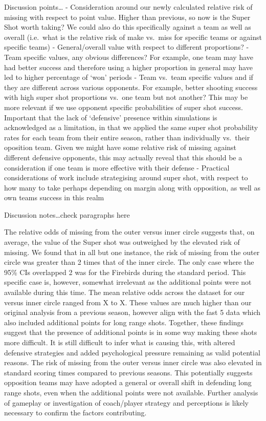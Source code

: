 \documentclass[]{elsarticle} %
\begin{document}
Discussion points\ldots{} - Consideration around our newly calculated
relative risk of missing with respect to point value. Higher than
previous, so now is the Super Shot worth taking? We could also do this
specifically against a team as well as overall (i.e.~what is the
relative risk of make vs.~miss for specific teams or against specific
teams) - General/overall value with respect to different proportions? -
Team specific values, any obvious differences? For example, one team may
have had better success and therefore using a higher proportion in
general may have led to higher percentage of `won' periods - Team
vs.~team specific values and if they are different across various
opponents. For example, better shooting success with high super shot
proportions vs.~one team but not another? This may be more relevant if
we use opponent specific probabilities of super shot success. Important
that the lack of `defensive' presence within simulations is acknowledged
as a limitation, in that we applied the same super shot probability
rates for each team from their entire season, rather than individually
vs.~their oposition team. Given we might have some relative risk of
missing against different defensive opponents, this may actually reveal
that this should be a consideration if one team is more effective with
their defense - Practical considerations of work include strategising
around super shot, with respect to how many to take perhaps depending on
margin along with opposition, as well as own teams success in this realm

Discussion notes\ldots check paragraphs here

The relative odds of missing from the outer versus inner circle suggests
that, on average, the value of the Super shot was outweighed by the
elevated risk of missing. We found that in all but one instance, the
risk of missing from the outer circle was greater than 2 times that of
the inner circle. The only case where the 95\% CIs overlapped 2 was for
the Firebirds during the standard period. This specific case is,
however, somewhat irrelevant as the additional points were not available
during this time. The mean relative odds across the dataset for our
versus inner circle ranged from X to X. These values are much higher
than our original analysis from a previous season, however align with
the fast 5 data which also included additional points for long range
shots. Together, these findings suggest that the presence of additional
points is in some way making these shots more difficult. It is still
difficult to infer what is causing this, with altered defensive
strategies and added psychological pressure remaining as valid potential
reasons. The risk of missing from the outer versus inner circle was also
elevated in standard scoring times compared to previous seasons. This
potentially suggests opposition teams may have adopted a general or
overall shift in defending long range shots, even when the additional
points were not available. Further analysis of gameplay or investigation
of coach/player strategy and perceptions is likely necessary to confirm
the factors contributing.
\end{document}
